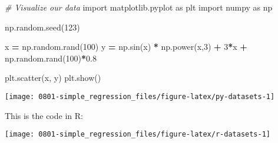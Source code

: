\documentclass[]{book}
\newenvironment{Shaded}{\begin{snugshade}}{\end{snugshade}}
\newcommand{\CommentTok}[1]{\textcolor[rgb]{0.56,0.35,0.01}{\textit{#1}}}
\newcommand{\DecValTok}[1]{\textcolor[rgb]{0.00,0.00,0.81}{#1}}
\newcommand{\FloatTok}[1]{\textcolor[rgb]{0.00,0.00,0.81}{#1}}
\newcommand{\ImportTok}[1]{#1}
\newcommand{\KeywordTok}[1]{\textcolor[rgb]{0.13,0.29,0.53}{\textbf{#1}}}
\newcommand{\NormalTok}[1]{#1}
\newcommand{\OperatorTok}[1]{\textcolor[rgb]{0.81,0.36,0.00}{\textbf{#1}}}
\newcommand{\StringTok}[1]{\textcolor[rgb]{0.31,0.60,0.02}{#1}}
\begin{document}
\begin{Shaded}
\begin{Highlighting}[]
\CommentTok{# Visualize our data}
\ImportTok{import}\NormalTok{ matplotlib.pyplot }\ImportTok{as}\NormalTok{ plt}
\ImportTok{import}\NormalTok{ numpy }\ImportTok{as}\NormalTok{ np}

\NormalTok{np.random.seed(}\DecValTok{123}\NormalTok{)}

\NormalTok{x }\OperatorTok{=}\NormalTok{ np.random.rand(}\DecValTok{100}\NormalTok{)}
\NormalTok{y }\OperatorTok{=}\NormalTok{ np.sin(x) }\OperatorTok{*}\NormalTok{ np.power(x,}\DecValTok{3}\NormalTok{) }\OperatorTok{+} \DecValTok{3}\OperatorTok{*}\NormalTok{x }\OperatorTok{+}\NormalTok{ np.random.rand(}\DecValTok{100}\NormalTok{)}\OperatorTok{*}\FloatTok{0.8}

\NormalTok{plt.scatter(x, y)}
\NormalTok{plt.show()}
\end{Highlighting}
\end{Shaded}

\texttt{[image: 0801-simple\_regression\_files/figure-latex/py-datasets-1]}

This is the code in R:

\begin{Shaded}
\end{Shaded}

\begin{center}\texttt{[image: 0801-simple\_regression\_files/figure-latex/r-datasets-1]} \end{center}
\end{document}
